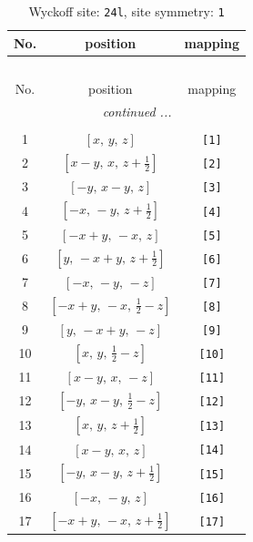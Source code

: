 \documentclass[fleqn,8pt]{jsarticle}
\begin{document}
\begin{longtable}{ccc}
\caption{Wyckoff site: {\tt 24l}, site symmetry: {\tt 1}}
 \\
 \hline \hline
No. & position & mapping \\ \hline \endfirsthead

\multicolumn{2}{l}{\tablename\ \thetable{}} \\
 \hline \hline
No. & position & mapping \\ \hline \endhead

 \hline \hline
\multicolumn{2}{r}{\footnotesize\it continued ...} \\ \endfoot

 \hline \hline
\multicolumn{2}{r}{} \\ \endlastfoot

1 & $\left[ x,\, y,\, z \right]$ & {\tt [1]} \\ \hline
2 & $\left[ x - y,\, x,\, z + \frac{1}{2} \right]$ & {\tt [2]} \\ \hline
3 & $\left[ - y,\, x - y,\, z \right]$ & {\tt [3]} \\ \hline
4 & $\left[ - x,\, - y,\, z + \frac{1}{2} \right]$ & {\tt [4]} \\ \hline
5 & $\left[ - x + y,\, - x,\, z \right]$ & {\tt [5]} \\ \hline
6 & $\left[ y,\, - x + y,\, z + \frac{1}{2} \right]$ & {\tt [6]} \\ \hline
7 & $\left[ - x,\, - y,\, - z \right]$ & {\tt [7]} \\ \hline
8 & $\left[ - x + y,\, - x,\, \frac{1}{2} - z \right]$ & {\tt [8]} \\ \hline
9 & $\left[ y,\, - x + y,\, - z \right]$ & {\tt [9]} \\ \hline
10 & $\left[ x,\, y,\, \frac{1}{2} - z \right]$ & {\tt [10]} \\ \hline
11 & $\left[ x - y,\, x,\, - z \right]$ & {\tt [11]} \\ \hline
12 & $\left[ - y,\, x - y,\, \frac{1}{2} - z \right]$ & {\tt [12]} \\ \hline
13 & $\left[ x,\, y,\, z + \frac{1}{2} \right]$ & {\tt [13]} \\ \hline
14 & $\left[ x - y,\, x,\, z \right]$ & {\tt [14]} \\ \hline
15 & $\left[ - y,\, x - y,\, z + \frac{1}{2} \right]$ & {\tt [15]} \\ \hline
16 & $\left[ - x,\, - y,\, z \right]$ & {\tt [16]} \\ \hline
17 & $\left[ - x + y,\, - x,\, z + \frac{1}{2} \right]$ & {\tt [17]} \\ \hline

\end{longtable}
\end{document}
